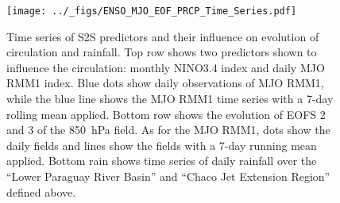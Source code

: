 \documentclass{article}
\begin{document}
\begin{figure}
  \texttt{[image: ../\_figs/ENSO\_MJO\_EOF\_PRCP\_Time\_Series.pdf]}
	\caption{
		Time series of S2S predictors and their influence on evolution of circulation and rainfall.
    Top row shows two predictors shown to influence the circulation: monthly NINO3.4 index and daily MJO RMM1 index.
    Blue dots show daily observations of MJO RMM1, while the blue line shows the MJO RMM1 time series with a 7-day rolling mean applied.
    Bottom row shows the evolution of EOFS 2 and 3 of the \SI{850}{\hecto\pascal} field.
    As for the MJO RMM1, dots show the daily fields and lines show the fields with a 7-day running mean applied.
    Bottom rain shows time series of daily rainfall over the ``Lower Paraguay River Basin'' and ``Chaco Jet Extension Region'' defined above.
	}
\end{figure}
\end{document}
